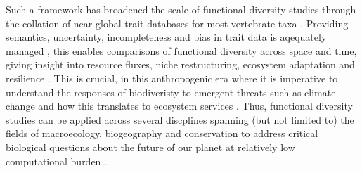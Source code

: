 \documentclass[11pt]{report}
\begin{document}
Such a framework has broadened the scale of functional diversity studies through the collation of near-global trait databases for most vertebrate taxa \citep[e.g.,][]{Tobias2022, Wilman2014, Oskyrko2024, Huang2023, Brosse2021}.
Providing semantics, uncertainty, incompleteness and bias in trait data is aqequately managed  \citep{Hortal2015,Dawson2021}, this enables comparisons of functional diversity across space and time, giving insight into resource fluxes, niche restructuring, ecosystem adaptation and resilience \citep[e.g.,][]{Cooke2019, 10.1098/rspb.2022.0071, Gazre2025}. 
This is crucial, in this anthropogenic era where it is imperative to understand the responses of biodiveristy to emergent threats such as climate change and how this translates to ecosystem services \citep{NUNES2026182318, PFENNINGBUTTERWORTH2024e270}.
Thus, functional diversity studies can be applied across several discplines spanning (but not limited to) the fields of macroecology, biogeography and conservation to address critical biological questions about the future of our planet at relatively low computational burden \citep[e.g.,][]{Pigot2020, Toussaint2021, https://doi.org/10.1111/ele.13905, Marino2025}.
\end{document}
